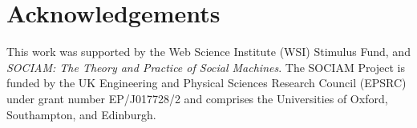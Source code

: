 \documentclass{sigchi}
\begin{document}



\section{Acknowledgements}
This work was supported by the Web Science Institute (WSI) Stimulus Fund, and \emph{SOCIAM: The Theory and Practice of Social Machines}.  The SOCIAM Project is funded by the UK Engineering and Physical Sciences Research Council (EPSRC) under grant number EP/J017728/2 and comprises the Universities of Oxford, Southampton, and Edinburgh.



\end{document}
